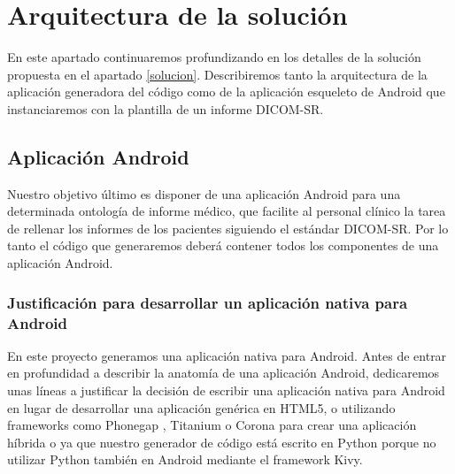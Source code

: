 
\section{Arquitectura de la solución}
En este apartado continuaremos profundizando en los detalles de la solución propuesta en el apartado \ref{solucion}. Describiremos tanto la arquitectura de la aplicación generadora del código como de la aplicación esqueleto de Android que instanciaremos con la plantilla de un informe DICOM-SR.\par

\subsection{Aplicación Android}
Nuestro objetivo último es disponer de una aplicación Android para una determinada ontología de informe médico,  que facilite al personal clínico la tarea de rellenar los informes de los pacientes siguiendo el estándar DICOM-SR. Por lo tanto el código que generaremos deberá contener todos los componentes de una aplicación Android.\par


\subsubsection{Justificación para desarrollar un aplicación nativa para Android}

En este proyecto generamos una aplicación nativa para Android. Antes de entrar en profundidad a describir la anatomía de una aplicación Android, dedicaremos unas líneas a justificar la decisión de escribir una aplicación nativa para Android en lugar de desarrollar una aplicación genérica en HTML5, o utilizando frameworks como Phonegap \cite{phonegap}, Titanium \cite{titanium} o Corona \cite{corona} para crear una aplicación híbrida o ya que nuestro generador de código está escrito en Python porque no utilizar Python también en Android mediante el framework Kivy\cite{kivy}.\medskip\par

